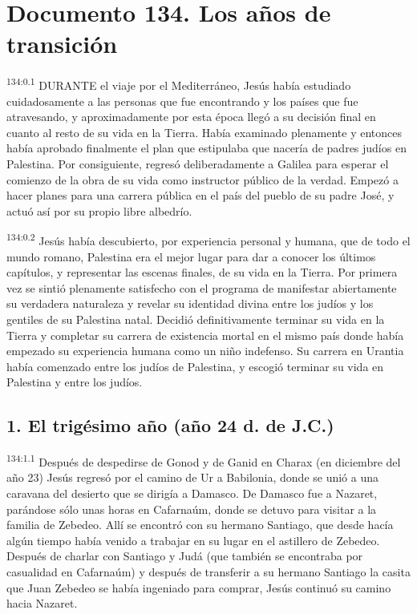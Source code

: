 \chapter{Documento 134. Los años de transición}
\par
\textsuperscript{134:0.1} DURANTE el viaje por el Mediterráneo, Jesús había estudiado cuidadosamente a las personas que fue encontrando y los países que fue atravesando, y aproximadamente por esta época llegó a su decisión final en cuanto al resto de su vida en la Tierra. Había examinado plenamente y entonces había aprobado finalmente el plan que estipulaba que nacería de padres judíos en Palestina. Por consiguiente, regresó deliberadamente a Galilea para esperar el comienzo de la obra de su vida como instructor público de la verdad. Empezó a hacer planes para una carrera pública en el país del pueblo de su padre José, y actuó así por su propio libre albedrío.

\par
\textsuperscript{134:0.2} Jesús había descubierto, por experiencia personal y humana, que de todo el mundo romano, Palestina era el mejor lugar para dar a conocer los últimos capítulos, y representar las escenas finales, de su vida en la Tierra. Por primera vez se sintió plenamente satisfecho con el programa de manifestar abiertamente su verdadera naturaleza y revelar su identidad divina entre los judíos y los gentiles de su Palestina natal. Decidió definitivamente terminar su vida en la Tierra y completar su carrera de existencia mortal en el mismo país donde había empezado su experiencia humana como un niño indefenso. Su carrera en Urantia había comenzado entre los judíos de Palestina, y escogió terminar su vida en Palestina y entre los judíos.

\section*{1. El trigésimo año (año 24 d. de J.C.)}
\par
\textsuperscript{134:1.1} Después de despedirse de Gonod y de Ganid en Charax (en diciembre del año 23) Jesús regresó por el camino de Ur a Babilonia, donde se unió a una caravana del desierto que se dirigía a Damasco. De Damasco fue a Nazaret, parándose sólo unas horas en Cafarnaúm, donde se detuvo para visitar a la familia de Zebedeo. Allí se encontró con su hermano Santiago, que desde hacía algún tiempo había venido a trabajar en su lugar en el astillero de Zebedeo. Después de charlar con Santiago y Judá (que también se encontraba por casualidad en Cafarnaúm) y después de transferir a su hermano Santiago la casita que Juan Zebedeo se había ingeniado para comprar, Jesús continuó su camino hacia Nazaret.

